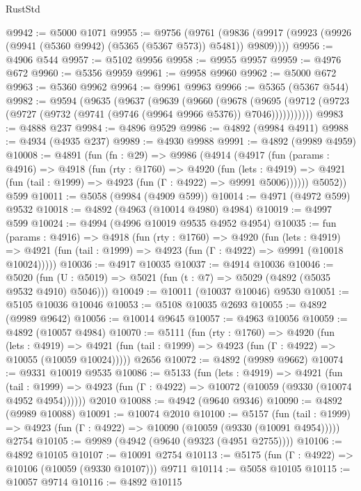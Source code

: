 \begin{lexlean}{RustStd}
\begin{coremodule}
@9942 := @5000 @1071
@9955 := @9756
    (@9761 (@9836 (@9917 (@9923 (@9926 (@9941 (@5360 @9942) (@5365 (@5367 @573)) @5481)) @9809))))
@9956 := @4906 @544
@9957 := @5102 @9956
@9958 := @9955 @9957
@9959 := @4976 @672
@9960 := @5356 @9959
@9961 := @9958 @9960
@9962 := @5000 @672
@9963 := @5360 @9962
@9964 := @9961 @9963
@9966 := @5365 (@5367 @544)
@9982 := @9594
    (@9635
      (@9637
        (@9639
          (@9660
            (@9678
              (@9695 (@9712 (@9723 (@9727 (@9732 (@9741 (@9746 (@9964 @9966 @5376)) @7046)))))))))))
@9983 := @4888 @237
@9984 := @4896 @9529
@9986 := @4892 (@9984 @4911)
@9988 := @4934 (@4935 @237)
@9989 := @4930 @9988
@9991 := @4892 (@9989 @4959)
@10008 := @4891
    (fun (fn : @29) =>
    @9986
      (@4914
        (@4917
          (fun (params : @4916) =>
          @4918
            (fun (rty : @1760) =>
            @4920
              (fun (lets : @4919) =>
              @4921 (fun (tail : @1999) => @4923 (fun (Γ : @4922) => @9991 @5006))))))
        @5052))
    @599
@10011 := @5058 (@9984 (@4909 @599))
@10014 := @4971 (@4972 @599) @9532
@10018 := @4892 (@4963 (@10014 @4980) @4984)
@10019 := @4997 @599
@10024 := @4994 (@4996 @10019 @9535 @4952 @4954)
@10035 := fun (params : @4916) =>
  @4918
    (fun (rty : @1760) =>
    @4920
      (fun (lets : @4919) =>
      @4921 (fun (tail : @1999) => @4923 (fun (Γ : @4922) => @9991 (@10018 @10024)))))
@10036 := @4917 @10035
@10037 := @4914 @10036
@10046 := @5020 (fun (U : @5019) => @5021 (fun (t : @7) => @5029 (@4892 (@5035 @9532 @4910) @5046)))
@10049 := @10011 (@10037 @10046) @9530
@10051 := @5105 @10036 @10046
@10053 := @5108 @10035 @2693
@10055 := @4892 (@9989 @9642)
@10056 := @10014 @9645
@10057 := @4963 @10056
@10059 := @4892 (@10057 @4984)
@10070 := @5111
    (fun (rty : @1760) =>
    @4920
      (fun (lets : @4919) =>
      @4921 (fun (tail : @1999) => @4923 (fun (Γ : @4922) => @10055 (@10059 @10024)))))
    @2656
@10072 := @4892 (@9989 @9662)
@10074 := @9331 @10019 @9535
@10086 := @5133
    (fun (lets : @4919) =>
    @4921
      (fun (tail : @1999) =>
      @4923 (fun (Γ : @4922) => @10072 (@10059 (@9330 (@10074 @4952 @4954))))))
    @2010
@10088 := @4942 (@9640 @9346)
@10090 := @4892 (@9989 @10088)
@10091 := @10074 @2010
@10100 := @5157
    (fun (tail : @1999) => @4923 (fun (Γ : @4922) => @10090 (@10059 (@9330 (@10091 @4954)))))
    @2754
@10105 := @9989 (@4942 (@9640 (@9323 (@4951 @2755))))
@10106 := @4892 @10105
@10107 := @10091 @2754
@10113 := @5175 (fun (Γ : @4922) => @10106 (@10059 (@9330 @10107))) @9711
@10114 := @5058 @10105
@10115 := @10057 @9714
@10116 := @4892 @10115

\end{coremodule}
\end{lexlean}
